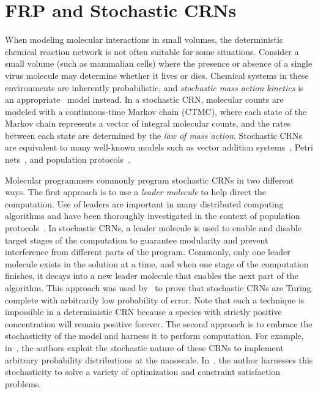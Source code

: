 
\section{FRP and Stochastic CRNs}
\label{sec:frp_scrns}

When modeling molecular interactions in small volumes, the deterministic chemical reaction network is not often suitable for some situations.
Consider a small volume (such as mammalian cells) where the presence or absence of a single virus molecule may determine whether it lives or dies.
Chemical systems in these environments are inherently probabilistic, and \emph{stochastic mass action kinetics} is an appropriate~\cite{jGill77,oCSWB09} model instead.
In a stochastic CRN, molecular counts are modeled with a continuous-time Markov chain (CTMC), where each state of the Markov chain represents a vector of integral molecular counts, and the rates between each state are determined by the \emph{law of mass action}.
Stochastic CRNs are equivalent to many well-known models such as vector addition systems~\cite{oGins66,jKaMiWi67,jKarMil69,jNash73,jLero10,cLero12}, Petri nets~\cite{oPetr62,jMura89,oDavAll10,oReis13}, and population protocols~\cite{jAADFP06,jAAER07,jAnAsEi08,jAnAsEi08a,Doty2018}.

Molecular programmers commonly program stochastic CRNs in two different ways.
The first approach is to use a \emph{leader molecule} to help direct the computation.
Use of leaders are important in many distributed computing algorithms and have been thoroughly investigated in the context of population protocols~\cite{jAnAsEi08,Doty2018}.
In stochastic CRNs, a leader molecule is used to enable and disable target stages of the computation to guarantee modularity and prevent interference from different parts of the program.
Commonly, only one leader molecule exists in the solution at a time, and when one stage of the computation finishes, it decays into a new leader molecule that enables the next part of the algorithm.
This approach was used by~\cite{jSCWB08} to prove that stochastic CRNs are Turing complete with arbitrarily low probability of error.
Note that such a technique is impossible in a deterministic CRN because a species with strictly positive concentration will remain positive forever.
The second approach is to embrace the stochasticity of the model and harness it to perform computation.
For example, in~\cite{CAPPELLETTI202064}, the authors exploit the stochastic nature of these CRNs to implement arbitrary probability distributions at the nanoscale.
In~\cite{cWinfe19}, the author harnesses this stochasticity to solve a variety of optimization and constraint satisfaction problems.

